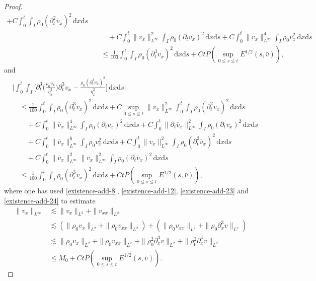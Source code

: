 \documentclass[11pt, reqno]{amsart}
\newcommand{\diff}{\mathrm{d}}
\numberwithin{equation}{section}
\begin{document}
{\begin{proof}
\begin{equation}
\begin{aligned}
+C\int_0^t\int_I\rho_0(\partial_t^2\bar{v}_x)^2\,\diff x\diff s\\
&\qquad+C\int_0^t\|\bar{v}_x\|_{L^\infty}^2\int_I\rho_0(\partial_t\bar{v}_x)^2\,\diff x\diff s
+C\int_0^t\|\bar{v}_x\|_{L^\infty}^4\int_I\rho_0\bar{v}_x^2\,\diff x\diff s\\
&\quad\leq \frac{1}{100}\int_0^t\int_I\rho_0(\partial_t^3v_x)^2\,\diff x\diff s+Ct P(\sup_{0\leq s\leq t}E^{1/2}(s,\bar{v})),
\end{aligned}
\end{equation}
and
\begin{equation}\label{existence-add-28}
\begin{aligned}
&\bigg|\int_0^t\int_I\bigg[\partial_t^3\bigg(\frac{\rho_0v_x}{\bar{\eta}_x^2}\bigg)\partial_t^3v_x
-\frac{\rho_0(\partial_t^3v_x)^2}{\bar{\eta}_x^2}\bigg]\,\diff x\diff s\bigg|\\
&\quad\leq \frac{1}{100}\int_0^t\int_I\rho_0(\partial_t^3v_x)^2\,\diff x\diff s
+C\sup_{0\leq s\leq t}\|\bar{v}_x\|_{L^\infty}^2\int_0^t\int_I\rho_0(\partial_t^2v_x)^2\,\diff x\diff s\\
&\qquad+C\int_0^t\|\bar{v}_x\|_{L^\infty}^4\int_I\rho_0(\partial_tv_x)^2\,\diff x\diff s+C\int_0^t\|\partial_t\bar{v}_x\|_{L^\infty}^2\int_I\rho_0(\partial_tv_x)^2\,\diff x\diff s\\
&\qquad+C\int_0^t\|\bar{v}_x\|_{L^\infty}^6\int_I\rho_0v_x^2\,\diff x\diff s+C\int_0^t\|v_x\|_{L^\infty}^2\int_I\rho_0(\partial_t^2\bar{v}_x)^2\,\diff x\diff s\\
&\qquad+C\int_0^t\|\bar{v}_x\|_{L^\infty}^2\|v_x\|_{L^\infty}^2\int_I\rho_0(\partial_t\bar{v}_x)^2\,\diff x\diff s\\
&\quad\leq \frac{1}{100}\int_0^t\int_I\rho_0(\partial_t^3v_x)^2\,\diff x\diff s+Ct P(\sup_{0\leq s\leq t}E^{1/2}(s,\bar{v})),
\end{aligned}
\end{equation}
where one has used \eqref{existence-add-8}, \eqref{existence-add-12}, \eqref{existence-add-23} and \eqref{existence-add-24} to estimate 
\begin{equation*}
\begin{aligned}
\|v_x\|_{L^\infty}&\lesssim \|v_x\|_{L^2}+\|v_{xx}\|_{L^2}\\
&\lesssim (\|\rho_0v_x\|_{L^2}+\|\rho_0v_{xx}\|_{L^2})+(\|\rho_0v_{xx}\|_{L^2}+\|\rho_0\partial_x^3v\|_{L^2})\\
&\lesssim \|\rho_0v_x\|_{L^2}+\|\rho_0v_{xx}\|_{L^2}+\|\rho_0^2\partial_x^3v\|_{L^2}+\|\rho_0^2\partial_x^4v\|_{L^2}\\
&\leq M_0+Ct P(\sup_{0\leq s\leq t}E^{1/2}(s,\bar{v})). 
\end{aligned}
\end{equation*}


\end{proof}}
\end{document}
